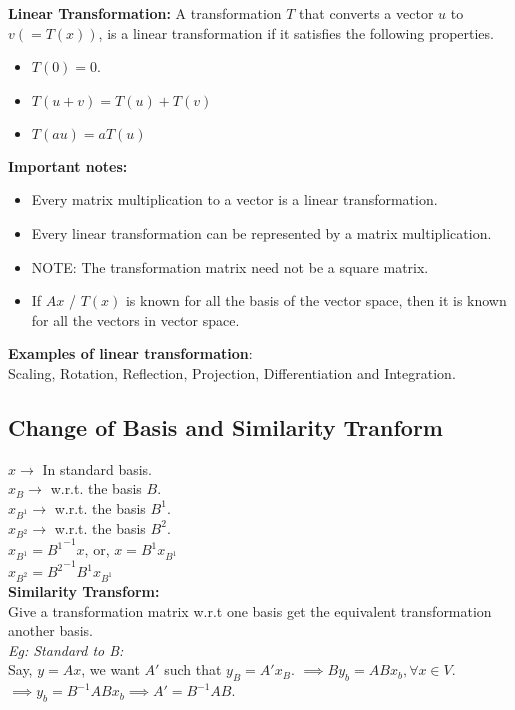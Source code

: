 \textbf{Linear Transformation:} A transformation $T$ that converts a vector $u$ to $v (= T(x))$, is a linear transformation if it satisfies the following properties.
\begin{itemize}
	\item $T(0) = 0$.
	\item $T(u + v) = T(u) + T(v)$
	\item $T(au) = aT(u)$
\end{itemize}


\textbf{Important notes:}
\begin{itemize}
\item Every matrix multiplication to a vector is a linear transformation.
\item Every linear transformation can be represented by a matrix multiplication.
\item NOTE: The transformation matrix need not be a square matrix.
\item If $Ax$ / $T(x)$ is known for all the basis of the vector space, then it is known for all the vectors in vector space.
\end{itemize}

\textbf{Examples of linear transformation}:\\
Scaling, Rotation, Reflection, Projection, Differentiation and Integration.\\


\subsection{Change of Basis and Similarity Tranform}

$x \rightarrow $ In standard basis.\\
$x_B \rightarrow$ w.r.t. the basis $B$.\\
$x_{B^1} \rightarrow$ w.r.t. the basis $B^1$.\\
$x_{B^2} \rightarrow$ w.r.t. the basis $B^2$.\\

$x_{B^1} = {B^1}^{-1} x$, or, $x = B^1x_{B^1}$\\
$x_{B^2} = {B^2}^{-1}B^1x_{B^1}$\\


\textbf{Similarity Transform:}\\

Give a transformation matrix w.r.t one basis get the equivalent transformation
another basis. \\
\textit{Eg: Standard to B:}\\
Say, $y = Ax$, we want $A'$ such that $y_{B} = A' x_B$.
$\implies By_b = ABx_b, \forall x \in V$.
$\implies y_b = B^{-1}ABx_b \implies A' = B^{-1}AB$.